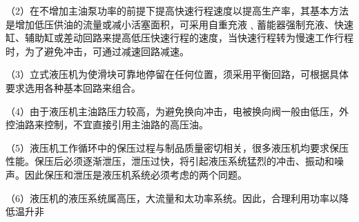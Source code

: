 （2）在不增加主油泵功率的前提下提高快速行程速度以提高生产率，其基本方法是增加低压供油的流量或减小活塞面积，可采用自重充液﹑蓄能器强制充液、快速缸、辅助缸或差动回路来提高低压快速行程的速度，当快速行程转为慢速工作行程时，为了避免冲击，可通过减速回路减速。

（3）立式液压机为使滑块可靠地停留在任何位置，须采用平衡回路，可根据具体要求选用各种基本回路来组合。

（4）由于液压机主油路压力较高，为避免换向冲击，电被换向阀一般由低压，外控油路来控制，不宜直接引用主油路的高压油。

（5）液压机工作循环中的保压过程与制品质量密切相关，很多液压机均要求保压性能。保压后必须逐渐泄压，泄压过快，将引起液压系统猛烈的冲击、振动和噪声。因此保压和泄压是液压机系统必须考虑的两个同题。

（6）液压机的液压系统属高压，大流量和太功率系统。因此，合理利用功率以降低温升非



